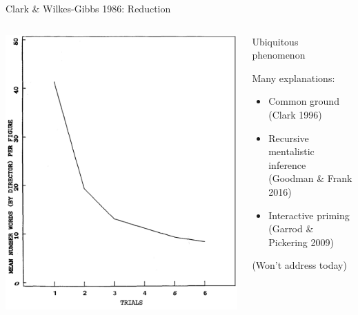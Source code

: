 \documentclass[ 12pt, xcolor=beamer,table,usenames,dvipsnames, ignorenonframetext, ngerman]{beamer}
\begin{document}
\begin{frame}{\large Clark \& Wilkes-Gibbs 1986: Reduction}
	\begin{columns}
		\begin{column}{.55\textwidth}
				\includegraphics[width=\textwidth]{../images/clark_words.png}
		\end{column}
	\begin{column}{.45\textwidth}
		\pause
		
		Ubiquitous phenomenon
		\smallskip
		
		Many explanations:
		\begin{itemize}
			\item Common ground {\footnotesize (Clark 1996)}
			\item Recursive mentalistic inference  {\footnotesize (Goodman \& Frank 2016)}
			\item Interactive priming {\footnotesize (Garrod \& Pickering 2009)}
		\end{itemize}
	 (Won't address today)
	\end{column}
	\end{columns}
	


	
\end{frame}
\end{document}

